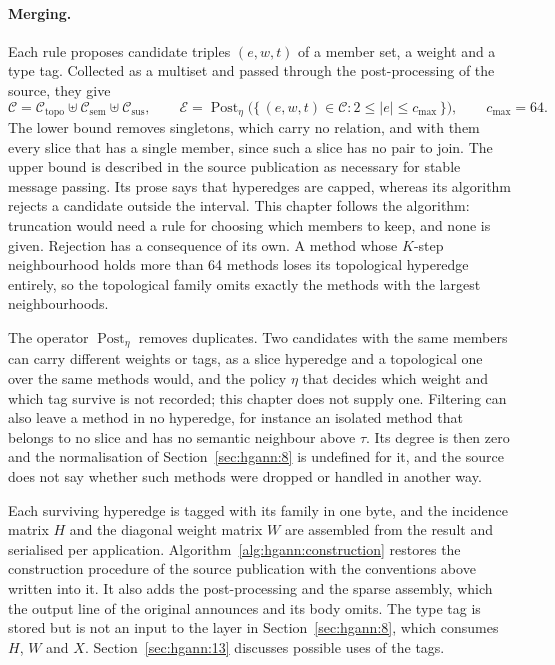 \paragraph{Merging.} Each rule proposes candidate triples $(e, w, t)$ of a member set, a weight and
a type tag. Collected as a multiset and passed through the post-processing of the source, they give
\begin{equation}
  \mathcal{C} = \mathcal{C}_{\text{topo}} \uplus \mathcal{C}_{\text{sem}} \uplus \mathcal{C}_{\text{sus}} ,
  \qquad
  \mathcal{E} = \operatorname{Post}_{\eta}\bigl( \{\, (e, w, t) \in \mathcal{C} :
  2 \le \lvert e \rvert \le c_{\max} \,\} \bigr) ,
  \qquad c_{\max} = 64 .
  \label{eq:hgann:merge}
\end{equation}
The lower bound removes singletons, which carry no relation, and with them every slice that has a
single member, since such a slice has no pair to join. The upper bound is described in the source
publication as necessary for stable message passing. Its prose says that hyperedges are capped,
whereas its algorithm rejects a candidate outside the interval. This chapter follows the algorithm:
truncation would need a rule for choosing which members to keep, and none is given. Rejection has a
consequence of its own. A method whose $K$-step neighbourhood holds more than 64 methods loses its
topological hyperedge entirely, so the topological family omits exactly the methods with the
largest neighbourhoods.

The operator $\operatorname{Post}_{\eta}$ removes duplicates. Two candidates with the same members
can carry different weights or tags, as a slice hyperedge and a topological one over the same
methods would, and the policy $\eta$ that decides which weight and which tag survive is not
recorded; this chapter does not supply one. Filtering can also leave a method in no hyperedge, for
instance an isolated method that belongs to no slice and has no semantic neighbour above $\tau$.
Its degree is then zero and the normalisation of Section~\ref{sec:hgann:8} is undefined for it, and
the source does not say whether such methods were dropped or handled in another way.

Each surviving hyperedge is tagged with its family in one byte, and the incidence matrix $H$ and
the diagonal weight matrix $W$ are assembled from the result and serialised per application.
Algorithm~\ref{alg:hgann:construction} restores the construction procedure of the source
publication with the conventions above written into it. It also adds the post-processing and the
sparse assembly, which the output line of the original announces and its body omits. The type tag
is stored but is not an input to the layer in Section~\ref{sec:hgann:8}, which consumes $H$, $W$
and $X$. Section~\ref{sec:hgann:13} discusses possible uses of the tags.


